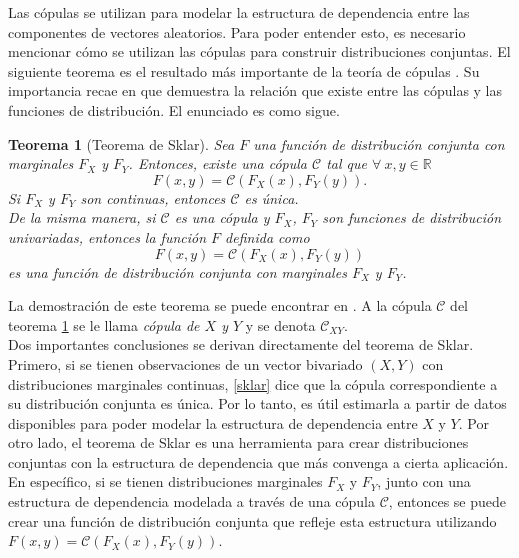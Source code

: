 \documentclass[11pt,a4paper]{article}
\newcommand{\R}{\mathbb{R}}
\newcommand{\C}{\mathcal{C}}
\newtheorem{theorem}{Teorema}[section]
\begin{document}
Las cópulas se utilizan para modelar la estructura de dependencia entre las componentes de vectores aleatorios. Para poder entender esto, es necesario mencionar cómo se utilizan las cópulas para construir distribuciones conjuntas. El siguiente teorema es el resultado más importante de la teoría de cópulas \citep{copula_modeling}. Su importancia recae en que demuestra la relación que existe entre las cópulas y las funciones de distribución. El enunciado es como sigue.\\

\begin{theorem}[Teorema de Sklar]
\label{sklar}
Sea $F$ una función de distribución conjunta con marginales $F_X$ y $F_Y$. Entonces, existe una cópula $\C$ tal que $\forall \ x,y \in \R$ $$F(x,y) = \C(F_X(x), F_Y(y)).$$ Si $F_X$ y $F_Y$ son continuas, entonces $\C$ es única.\\

De la misma manera, si $\C$ es una cópula y $F_X$, $F_Y$ son funciones de distribución univariadas, entonces la función $F$ definida como $$F(x, y) = \C(F_X(x), F_Y(y))$$ es una función de distribución conjunta con marginales $F_X$ y $F_Y$.\\
\end{theorem}

La demostración de este teorema se puede encontrar en \citet{nelsen}. A la cópula $\C$ del teorema \ref{sklar} se le llama \textit{cópula de $X$ y $Y$} y se denota $\C_{XY}$.\\

Dos importantes conclusiones se derivan directamente del teorema de Sklar. Primero, si se tienen observaciones de un vector bivariado $(X, Y)$ con distribuciones marginales continuas, \eqref{sklar} dice que la cópula correspondiente a su distribución conjunta es única. Por lo tanto, es útil estimarla a partir de datos disponibles para poder modelar la estructura de dependencia entre $X$ y $Y$. Por otro lado, el teorema de Sklar es una herramienta para crear distribuciones conjuntas con la estructura de dependencia que más convenga a cierta aplicación. En específico, si se tienen distribuciones marginales $F_X$ y $F_Y$, junto con una estructura de dependencia modelada a través de una cópula $\C$, entonces se puede crear una función de distribución conjunta que refleje esta estructura utilizando $F(x, y) = \C (F_X(x), F_Y(y))$.\\
\end{document}
